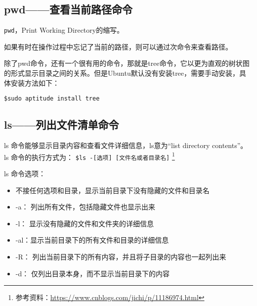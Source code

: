 \subsection{pwd——查看当前路径命令}
\verb*|pwd|，Print Working Directory的缩写。

如果有时在操作过程中忘记了当前的路径，则可以通过次命令来查看路径。

除了pwd命令，还有一个很有用的命令，那就是tree命令，它以更为直观的树状图的形式显示目录之间的关系。但是Ubuntu默认没有安装tree，需要手动安装，具体安装方法如下：

\verb*|$sudo aptitude install tree|


\subsection{ls——列出文件清单命令}
ls 命令能够显示目录内容和查看文件详细信息，ls意为“list directory contents”。 ls 命令的执行方式为：
\verb*|$ls -[选项] [文件名或者目录名]|
\footnote{参考资料：\url{https://www.cnblogs.com/jichi/p/11186974.html} }

ls 命令选项：
\begin{itemize}
\item 不接任何选项和目录，显示当前目录下没有隐藏的文件和目录名
\item  -a： 列出所有文件，包括隐藏文件也显示出来
\item  -l： 显示没有隐藏的文件和文件夹的详细信息
\item -al：显示当前目录下的所有文件和目录的详细信息
\item -R： 列出当前目录下的所有内容，并且将子目录的内容也一起列出来
\item -d： 仅列出目录本身，而不显示当前目录下的内容
\end{itemize}

